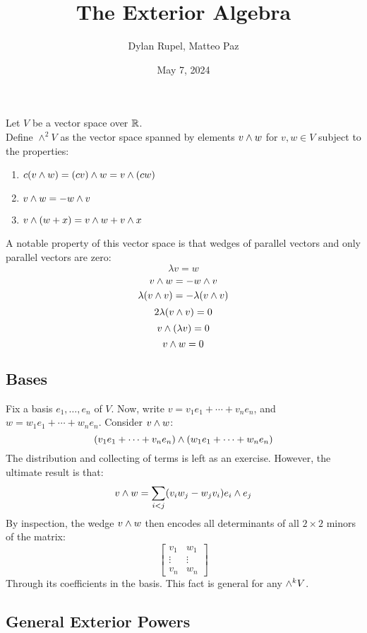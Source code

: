 \documentclass{article}
\author{Dylan Rupel, Matteo Paz}
\date{May 7, 2024}
\title{The Exterior Algebra}
\begin{document}
    \maketitle
    \begin{definition}
        Let $V$ be a vector space over $\mathbb{R}$. \\
        Define $\wedge^2 V$ as the vector space spanned by elements $v \wedge w$ for $v,w \in V$ subject to the properties:
        \begin{enumerate}
            \item $c(v \wedge w) = (cv) \wedge w = v \wedge (cw)$
            \item $v \wedge w = - w \wedge v$
            \item $v \wedge (w + x) = v \wedge w + v \wedge x$
        \end{enumerate}
    \end{definition}

    A notable property of this vector space is that wedges of parallel vectors and only parallel vectors are zero:
    \[\lambda v = w\]
    \[v \wedge w = - w \wedge v\]
    \[\lambda (v \wedge v) = - \lambda (v \wedge v)\]
    \[2\lambda(v \wedge v) = 0\]
    \[v \wedge (\lambda v) = 0\]
    \[v \wedge w = 0\]

    \subsection{Bases}
    Fix a basis $e_1, \ldots, e_n$ of $V$. Now, write $v = v_1e_1 + \cdots + v_ne_n$, and $w = w_1e_1 + \cdots + w_ne_n$. Consider $v \wedge w$:
    \[(v_1e_1 + \cdots + v_ne_n) \wedge ( w_1e_1 + \cdots + w_ne_n)\]
    The distribution and collecting of terms is left as an exercise. However, the ultimate result is that:
    \[v \wedge w = \sum_{i < j} (v_i w_j - w_j v_i) e_i \wedge e_j\]
    By inspection, the wedge $v \wedge w$ then encodes all determinants of all $2 \times 2$ minors of the matrix:
    \[\begin{bmatrix}
        v_1 & w_1 \\
        \vdots & \vdots \\
        v_n & w_n
    \end{bmatrix}\]
    Through its coefficients in the basis. This fact is general for any $\wedge^k V$.

    \subsection{General Exterior Powers}
\end{document}
